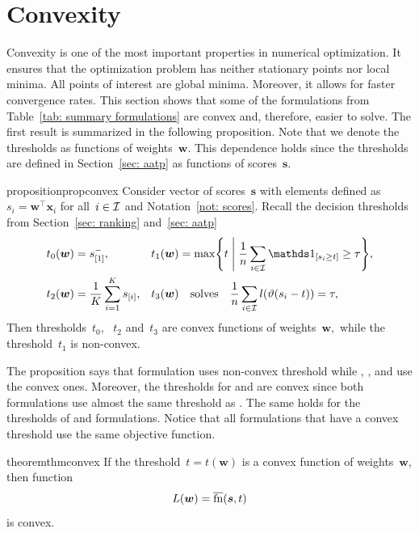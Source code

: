 \section{Convexity}\label{sec: convexity}

Convexity is one of the most important properties in numerical optimization. It ensures that the optimization problem has neither stationary points nor local minima. All points of interest are global minima. Moreover, it allows for faster convergence rates. This section shows that some of the formulations from Table~\ref{tab: summary formulations} are convex and, therefore, easier to solve. The first result is summarized in the following proposition. Note that we denote the thresholds as functions of weights~$\bm{w}.$ This dependence holds since the thresholds are defined in Section~\ref{sec: aatp} as functions of scores~$\bm{s}.$

\begin{restatable}{proposition}{propconvex}\label{prop: convexity}
  Consider vector of scores~$\bm{s}$ with elements defined as~$s_i = \bm{w}^{\top} \bm{x}_i$ for all~$i \in \mathcal{I}$ and Notation~\ref{not: scores}. Recall the decision thresholds from Section~\ref{sec: ranking} and~\ref{sec: aatp} 
  \begin{align*}
    t_0(\bm{w}) &
      = s_{[1]}^-, &
    t_1(\bm{w}) &
      = \max \Set{t}{\frac{1}{n} \sum_{i \in \I} \Iverson{s_i \geq t} \geq \tau}, \\
    t_2(\bm{w}) &
      = \frac{1}{K} \sum_{i=1}^{K} s_{[i]}, &
    t_3(\bm{w}) &
      \quad \text{solves} \quad \frac{1}{n} \sum_{i \in \I} l\Brac{\vartheta(s_i - t)} = \tau,
  \end{align*}
  Then thresholds~$t_0$, ~$t_2$ and~$t_3$ are convex functions of weights~$\bm{w},$ while the threshold~$t_1$ is non-convex.
\end{restatable}

The proposition says that \Grill formulation uses non-convex threshold while \TopPush, \TopMeanK, and \PatMat use the convex ones. Moreover, the thresholds for \tauFPL and \TopPushK are convex since both formulations use almost the same threshold as \TopMeanK. The same holds for the thresholds of \PatMat and \PatMatNP formulations. Notice that all formulations that have a convex threshold use the same objective function.

\begin{restatable}{theorem}{thmconvex}\label{thm: convexity}
  If the threshold~$t = t(\bm{w})$ is a convex function of weights~$\bm{w}$, then function
  \begin{equation*}
    L(\bm{w}) = \operatorname{\overline{fn}}(\bm{s}, t)
  \end{equation*}
  is convex.
\end{restatable}

